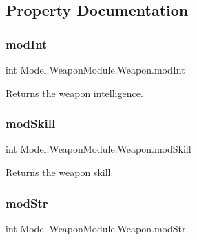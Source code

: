 \subsection{Property Documentation}
\hypertarget{interface_model_1_1_weapon_module_1_1_weapon_ac832d8b53ee20443375fd0a679d47814}{}\label{interface_model_1_1_weapon_module_1_1_weapon_ac832d8b53ee20443375fd0a679d47814} 
\subsubsection{\texorpdfstring{mod\+Int}{modInt}}
{\footnotesize\ttfamily int Model.\+Weapon\+Module.\+Weapon.\+mod\+Int\hspace{0.3cm}{\ttfamily [get]}}

Returns the weapon intelligence. \hypertarget{interface_model_1_1_weapon_module_1_1_weapon_a6718e7fbef49311b7649db6c7af46243}{}\label{interface_model_1_1_weapon_module_1_1_weapon_a6718e7fbef49311b7649db6c7af46243} 
\subsubsection{\texorpdfstring{mod\+Skill}{modSkill}}
{\footnotesize\ttfamily int Model.\+Weapon\+Module.\+Weapon.\+mod\+Skill\hspace{0.3cm}{\ttfamily [get]}}

Returns the weapon skill. \hypertarget{interface_model_1_1_weapon_module_1_1_weapon_a80957476be2d0f5fe7c18a59debf6386}{}\label{interface_model_1_1_weapon_module_1_1_weapon_a80957476be2d0f5fe7c18a59debf6386} 
\subsubsection{\texorpdfstring{mod\+Str}{modStr}}
{\footnotesize\ttfamily int Model.\+Weapon\+Module.\+Weapon.\+mod\+Str\hspace{0.3cm}{\ttfamily [get]}}

